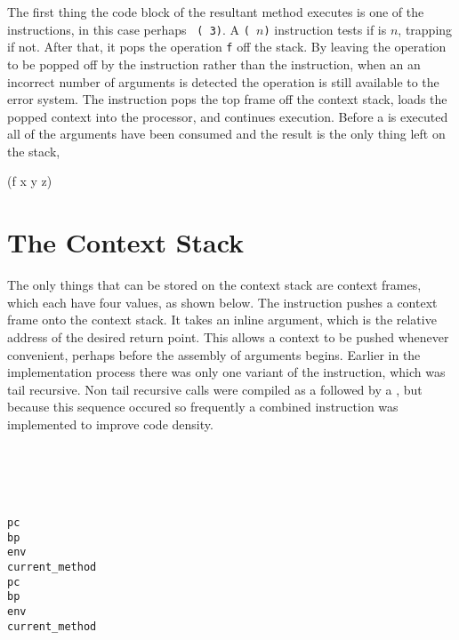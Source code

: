 The first thing the code block of the resultant method executes is one
of the  instructions, in this case perhaps {\tt
( 3)}.  A \texttt{( $n$)} instruction
tests if  is $n$, trapping if not.  After that, it pops the
operation \texttt{f} off the stack.  By leaving the operation to be
popped off by the  instruction rather than the
 instruction, when an an incorrect number of arguments is
detected the operation is still available to the error system.  The
 instruction pops the top frame off the context stack,
loads the popped context into the processor, and continues execution.
Before a
 is executed all of the arguments have been consumed and
the result is the only thing left on the stack,
\begin{stackphoto}
 (f x y z) \\\hline
\end{stackphoto}

\section{The Context Stack}

The only things that can be stored on the context stack are context
frames, which each have four values, as shown below.  The 
instruction pushes a context frame onto the context stack.  It takes
an inline argument, which is the relative address of the desired
return point.  This allows a context to be pushed whenever convenient,
perhaps before the assembly of arguments begins.  Earlier in the
implementation process there was only one variant of the 
instruction, which was tail recursive.  Non tail recursive calls were
compiled as a  followed by a , but
because this sequence occured so frequently a combined instruction was
implemented to improve code density.

\begin{stackphoto}\hline
  \tt {}  \\ \hline
  \tt {}  \\ \hline
  \tt {} \\\hline
  \tt {} \\\hline\hline
  \tt pc  \\ \hline
  \tt bp  \\ \hline
  \tt env \\\hline
  \tt current\_method \\\hline\hline
  \tt pc  \\ \hline
  \tt bp  \\ \hline
  \tt env \\\hline
  \tt current\_method \\\hline
\end{stackphoto}

